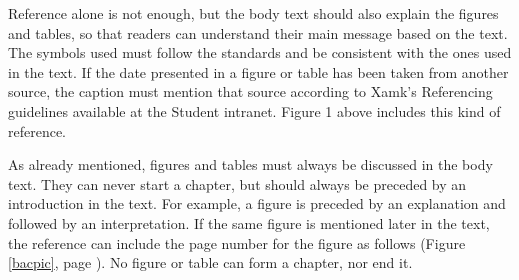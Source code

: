 \documentclass[12pt]{article}
\begin{document}
Reference alone is not enough, but the body text should also explain the figures and tables, so that readers can understand their main message based on the text. The symbols used must follow the standards and be consistent with the ones used in the text. If the date presented in a figure or table has been taken from another source, the caption must mention that source according to Xamk’s Referencing guidelines available at the Student intranet. Figure 1 above includes this kind of reference.

As already mentioned, figures and tables must always be discussed in the body text. They can never start a chapter, but should always be preceded by an introduction in the text. For example, a figure is preceded by an explanation and followed by an interpretation. If the same figure is mentioned later in the text, the reference can include the page number for the figure as follows (Figure \ref{bacpic}, page \pageref{bacpic}). No figure or table can form a chapter, nor end it.
\end{document}
